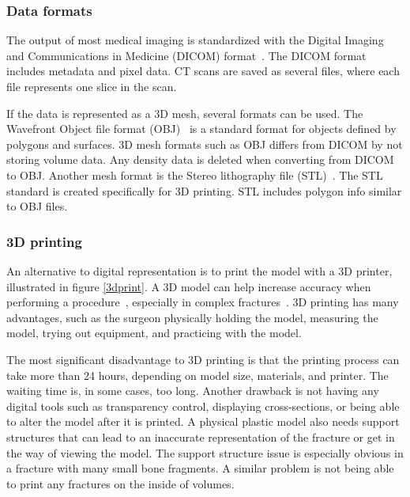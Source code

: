 \documentclass[a4paper]{report}
\begin{document}
\subsubsection{Data formats}

The output of most medical imaging is standardized with the Digital Imaging and Communications in Medicine (DICOM) format~\cite{noauthor_dicom_nodate}. The DICOM format includes metadata and pixel data. CT scans are saved as several files, where each file represents one slice in the scan.

If the data is represented as a 3D mesh, several formats can be used. The Wavefront Object file format (OBJ)~\cite{obj_wavefront_nodate} is a standard format for objects defined by polygons and surfaces. 3D mesh formats such as OBJ differs from DICOM by not storing volume data. Any density data is deleted when converting from DICOM to OBJ.
Another mesh format is the Stereo lithography file (STL)~\cite{noauthor_stl_2019}. The STL standard is created specifically for 3D printing. STL includes polygon info similar to OBJ files.

\subsubsection{ 3D printing }

An alternative to digital representation is to print the model with a 3D printer, illustrated in figure \ref{3dprint}. A 3D model can help increase accuracy when performing a procedure~\cite{shahrubudin_overview_2019}, especially in complex fractures~\cite{chen_efficacy_2019}. 
3D printing has many advantages, such as the surgeon physically holding the model, measuring the model, trying out equipment, and practicing with the model.

The most significant disadvantage to 3D printing is that the printing process can take more than 24 hours, depending on model size, materials, and printer. The waiting time is, in some cases, too long. 
Another drawback is not having any digital tools such as transparency control, displaying cross-sections, or being able to alter the model after it is printed. 
A physical plastic model also needs support structures that can lead to an inaccurate representation of the fracture or get in the way of viewing the model. The support structure issue is especially obvious in a fracture with many small bone fragments. A similar problem is not being able to print any fractures on the inside of volumes.
\end{document}
